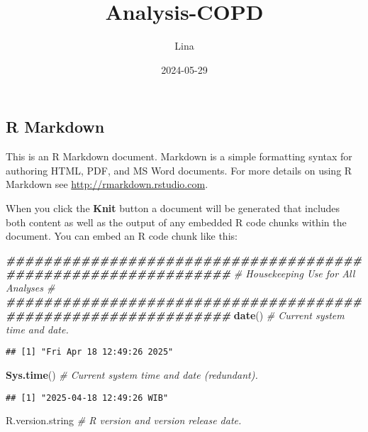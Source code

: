 \documentclass[
]{article}
\title{Analysis-COPD}
\author{Lina}
\date{2024-05-29}
\newenvironment{Shaded}{\begin{snugshade}}{\end{snugshade}}
\newcommand{\CommentTok}[1]{\textcolor[rgb]{0.56,0.35,0.01}{\textit{#1}}}
\newcommand{\DocumentationTok}[1]{\textcolor[rgb]{0.56,0.35,0.01}{\textbf{\textit{#1}}}}
\newcommand{\FunctionTok}[1]{\textcolor[rgb]{0.13,0.29,0.53}{\textbf{#1}}}
\newcommand{\NormalTok}[1]{#1}
\begin{document}
\maketitle

\subsection{R Markdown}\label{r-markdown}

This is an R Markdown document. Markdown is a simple formatting syntax
for authoring HTML, PDF, and MS Word documents. For more details on
using R Markdown see \url{http://rmarkdown.rstudio.com}.

When you click the \textbf{Knit} button a document will be generated
that includes both content as well as the output of any embedded R code
chunks within the document. You can embed an R code chunk like this:

\begin{Shaded}
\begin{Highlighting}[]
\DocumentationTok{\#\#\#\#\#\#\#\#\#\#\#\#\#\#\#\#\#\#\#\#\#\#\#\#\#\#\#\#\#\#\#\#\#\#\#\#\#\#\#\#\#\#\#\#\#\#\#\#\#\#\#\#\#\#\#\#\#\#\#\#\#\# }
\CommentTok{\# Housekeeping Use for All Analyses \#}
\DocumentationTok{\#\#\#\#\#\#\#\#\#\#\#\#\#\#\#\#\#\#\#\#\#\#\#\#\#\#\#\#\#\#\#\#\#\#\#\#\#\#\#\#\#\#\#\#\#\#\#\#\#\#\#\#\#\#\#\#\#\#\#\#\#\#}
\FunctionTok{date}\NormalTok{() }\CommentTok{\# Current system time and date. }
\end{Highlighting}
\end{Shaded}

\begin{verbatim}
## [1] "Fri Apr 18 12:49:26 2025"
\end{verbatim}

\begin{Shaded}
\begin{Highlighting}[]
\FunctionTok{Sys.time}\NormalTok{() }\CommentTok{\# Current system time and date (redundant).}
\end{Highlighting}
\end{Shaded}

\begin{verbatim}
## [1] "2025-04-18 12:49:26 WIB"
\end{verbatim}

\begin{Shaded}
\begin{Highlighting}[]
\NormalTok{R.version.string }\CommentTok{\# R version and version release date.}
\end{Highlighting}
\end{Shaded}
\end{document}
